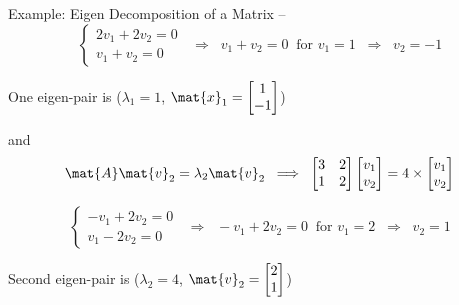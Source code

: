 \begin{frame}{Example: Eigen Decomposition of a Matrix --}
    \begin{equation*}
        \begin{cases}
            2v_1+2v_2=0 \\
            v_1+v_2=0
        \end{cases}
        \;\; \Longrightarrow\;\; v_1+v_2=0\;\;\text{for }v_1=1 \;\; \Longrightarrow\;\;v_2=-1
    \end{equation*}
    \begin{center}
        One eigen-pair is   ($\lambda_1=1$, $\mat{x}_1=\begin{bmatrix}1\\-1\end{bmatrix}$)
    \end{center}
    and
    \begin{equation*}
        \mat{A}\mat{v}_2=\lambda_2\mat{v}_2\;\;\Longrightarrow\;\;
        \begin{bmatrix}
            3 & 2 \\
            1 & 2
        \end{bmatrix}
        \begin{bmatrix}v_1\\v_2\end{bmatrix}
        = 4\times   \begin{bmatrix}v_1\\v_2\end{bmatrix}
    \end{equation*}

    \begin{equation*}
        \begin{cases}
            -v_1+2v_2=0 \\
            v_1-2v_2=0
        \end{cases}
        \;\; \Longrightarrow\;\; -v_1+2v_2=0\;\;\text{for }v_1=2 \;\; \Longrightarrow\;\;v_2=1
    \end{equation*}

    \begin{center} Second eigen-pair is   ($\lambda_2=4$, $\mat{v}_2=
        \begin{bmatrix}2 \\1 \end{bmatrix}$)
    \end{center}


\end{frame}
